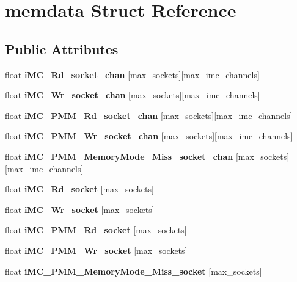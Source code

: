 \section{memdata Struct Reference}
\label{structmemdata}
\subsection*{Public Attributes}
\begin{DoxyCompactItemize}
\item 
\mbox{\label{structmemdata_ab6c2b2f802d5f0d69ddd546dcf21e142}} 
float {\bfseries i\+M\+C\+\_\+\+Rd\+\_\+socket\+\_\+chan} [max\+\_\+sockets][max\+\_\+imc\+\_\+channels]
\item 
\mbox{\label{structmemdata_aeac15c4ce5b43f024cecca4c58f3b176}} 
float {\bfseries i\+M\+C\+\_\+\+Wr\+\_\+socket\+\_\+chan} [max\+\_\+sockets][max\+\_\+imc\+\_\+channels]
\item 
\mbox{\label{structmemdata_a63f3334f9e14b36a4cfecd9b3e4663ba}} 
float {\bfseries i\+M\+C\+\_\+\+P\+M\+M\+\_\+\+Rd\+\_\+socket\+\_\+chan} [max\+\_\+sockets][max\+\_\+imc\+\_\+channels]
\item 
\mbox{\label{structmemdata_a03fc6c7fd65fd5cb8771a0c7ab461a03}} 
float {\bfseries i\+M\+C\+\_\+\+P\+M\+M\+\_\+\+Wr\+\_\+socket\+\_\+chan} [max\+\_\+sockets][max\+\_\+imc\+\_\+channels]
\item 
\mbox{\label{structmemdata_a4de240f52c8693f02a75301028d17926}} 
float {\bfseries i\+M\+C\+\_\+\+P\+M\+M\+\_\+\+Memory\+Mode\+\_\+\+Miss\+\_\+socket\+\_\+chan} [max\+\_\+sockets][max\+\_\+imc\+\_\+channels]
\item 
\mbox{\label{structmemdata_aaf918650a303e6a99dc353263ade35a4}} 
float {\bfseries i\+M\+C\+\_\+\+Rd\+\_\+socket} [max\+\_\+sockets]
\item 
\mbox{\label{structmemdata_a689eb20051fcd7d835ee5e685db6390f}} 
float {\bfseries i\+M\+C\+\_\+\+Wr\+\_\+socket} [max\+\_\+sockets]
\item 
\mbox{\label{structmemdata_a12458959ecc07268e6f63cfc5e87342d}} 
float {\bfseries i\+M\+C\+\_\+\+P\+M\+M\+\_\+\+Rd\+\_\+socket} [max\+\_\+sockets]
\item 
\mbox{\label{structmemdata_a10e94ebeddb7d00829cb4e7399030bd1}} 
float {\bfseries i\+M\+C\+\_\+\+P\+M\+M\+\_\+\+Wr\+\_\+socket} [max\+\_\+sockets]
\item 
\mbox{\label{structmemdata_a1f768a1e279a19b89cbf068f9df9b3a3}} 
float {\bfseries i\+M\+C\+\_\+\+P\+M\+M\+\_\+\+Memory\+Mode\+\_\+\+Miss\+\_\+socket} [max\+\_\+sockets]

\end{DoxyCompactItemize}

